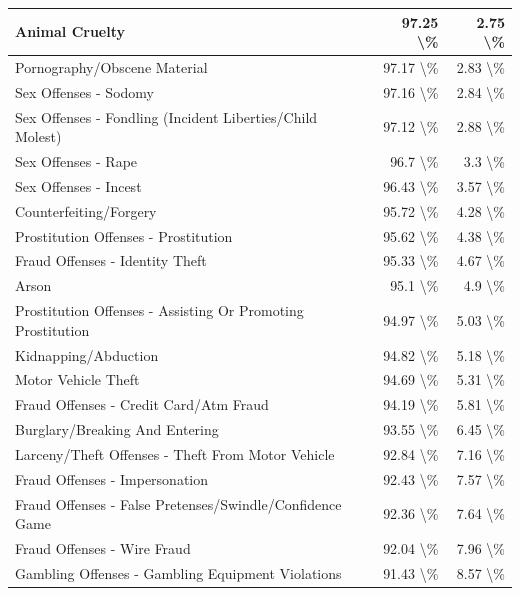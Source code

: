 \documentclass[
]{krantz}
\begin{document}
\begin{longtable}[t]{l|r|r}
\hline
Animal Cruelty & 97.25 \textbackslash{}\% & 2.75 \textbackslash{}\%\\
\hline
Pornography/Obscene Material & 97.17 \textbackslash{}\% & 2.83 \textbackslash{}\%\\
\hline
Sex Offenses - Sodomy & 97.16 \textbackslash{}\% & 2.84 \textbackslash{}\%\\
\hline
Sex Offenses - Fondling (Incident Liberties/Child Molest) & 97.12 \textbackslash{}\% & 2.88 \textbackslash{}\%\\
\hline
Sex Offenses - Rape & 96.7 \textbackslash{}\% & 3.3 \textbackslash{}\%\\
\hline
Sex Offenses - Incest & 96.43 \textbackslash{}\% & 3.57 \textbackslash{}\%\\
\hline
Counterfeiting/Forgery & 95.72 \textbackslash{}\% & 4.28 \textbackslash{}\%\\
\hline
Prostitution Offenses - Prostitution & 95.62 \textbackslash{}\% & 4.38 \textbackslash{}\%\\
\hline
Fraud Offenses - Identity Theft & 95.33 \textbackslash{}\% & 4.67 \textbackslash{}\%\\
\hline
Arson & 95.1 \textbackslash{}\% & 4.9 \textbackslash{}\%\\
\hline
Prostitution Offenses - Assisting Or Promoting Prostitution & 94.97 \textbackslash{}\% & 5.03 \textbackslash{}\%\\
\hline
Kidnapping/Abduction & 94.82 \textbackslash{}\% & 5.18 \textbackslash{}\%\\
\hline
Motor Vehicle Theft & 94.69 \textbackslash{}\% & 5.31 \textbackslash{}\%\\
\hline
Fraud Offenses - Credit Card/Atm Fraud & 94.19 \textbackslash{}\% & 5.81 \textbackslash{}\%\\
\hline
Burglary/Breaking And Entering & 93.55 \textbackslash{}\% & 6.45 \textbackslash{}\%\\
\hline
Larceny/Theft Offenses - Theft From Motor Vehicle & 92.84 \textbackslash{}\% & 7.16 \textbackslash{}\%\\
\hline
Fraud Offenses - Impersonation & 92.43 \textbackslash{}\% & 7.57 \textbackslash{}\%\\
\hline
Fraud Offenses - False Pretenses/Swindle/Confidence Game & 92.36 \textbackslash{}\% & 7.64 \textbackslash{}\%\\
\hline
Fraud Offenses - Wire Fraud & 92.04 \textbackslash{}\% & 7.96 \textbackslash{}\%\\
\hline
Gambling Offenses - Gambling Equipment Violations & 91.43 \textbackslash{}\% & 8.57 \textbackslash{}\%\\

\end{longtable}
\end{document}
